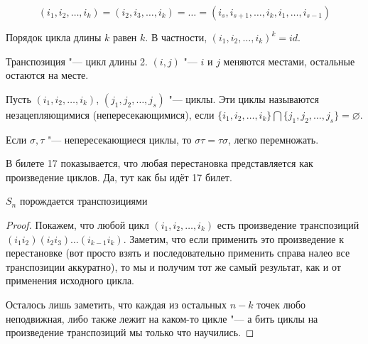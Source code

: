 \begin{Rem}
    \[(i_1, i_2, \dotsc, i_k) = (i_2, i_3, \dotsc, i_k) = \dotsc = (i_s, i_{s+1}, \dotsc, i_k, i_1, \dotsc, i_{s - 1})\]
\end{Rem}
\begin{Rem}
    Порядок цикла длины $k$ равен $k$. В частности, $(i_1, i_2, \dotsc, i_k)^k = id$.
\end{Rem}

\begin{Def}
	Транспозиция "--- цикл длины 2.
	$(i, j)$ "--- $i$ и $j$ меняются местами, остальные остаются на месте.
\end{Def}

\begin{Def}
	Пусть $(i_1, i_2, \dotsc, i_k)$, $(j_1, j_2, \dotsc, j_s)$ "--- циклы.
	Эти циклы называются незацепляющимися (непересекающимися), если $\{i_1, i_2, \dotsc, i_k\} \bigcap \{j_1, j_2, \dotsc, j_s\} = \varnothing$.
\end{Def}

\begin{Rem}
    Если $\sigma, \tau$ "--- непересекающиеся циклы, то $\sigma\tau = \tau\sigma$, легко перемножать.
\end{Rem}

В билете 17 показывается, что любая перестановка представляется как произведение циклов. Да, тут
как бы идёт 17 билет.

\begin{theorem}{$S_n$ порождается транспозициями}
\end{theorem}
\begin{proof}
Покажем, что любой цикл $(i_1, i_2, \dotsc, i_k)$ есть произведение транспозиций $(i_1 i_2)(i_2 i_3)\dotsc(i_{k - 1}i_k)$.
Заметим, что если применить это произведение к перестановке (вот просто взять и последовательно применить справа налео все транспозиции аккуратно), то мы и получим тот же самый результат, как и от применения исходного цикла.

Осталось лишь заметить, что каждая из остальных $n - k$ точек любо неподвижная, либо также лежит на каком-то цикле "--- а бить циклы на произведение транспозиций мы только что научились.
\end{proof}
